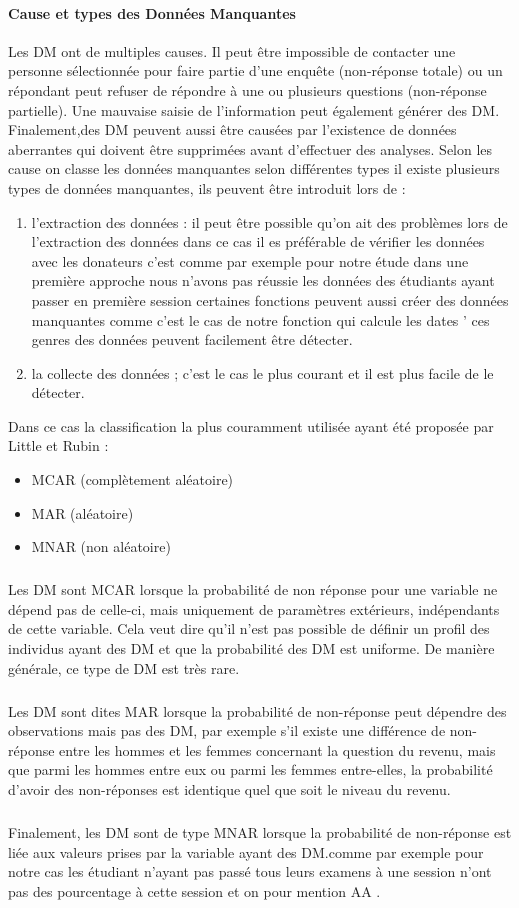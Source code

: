 \paragraph{Cause et types des Données Manquantes} \cite{MissinVal}
Les \ac{DM} ont de multiples causes. Il peut être
impossible de contacter une personne sélectionnée pour faire partie
d'une enquête (non-réponse totale) ou un répondant peut refuser de
répondre à une ou plusieurs questions (non-réponse partielle). Une
mauvaise saisie de l'information peut également générer des \ac{DM}.
Finalement,des \ac{DM} peuvent aussi être causées par l'existence de données
aberrantes qui doivent être supprimées avant d'effectuer des analyses.
Selon les cause on classe les données manquantes selon différentes types
il existe plusieurs types de données manquantes, ils peuvent être introduit lors de :
\begin{enumerate}
\item  l'extraction des données :
il peut être possible qu'on ait des problèmes lors de l'extraction des données 
dans ce cas il es préférable de vérifier les données avec les donateurs c'est comme par exemple pour notre étude dans une première approche nous n'avons pas réussie les données des étudiants ayant passer en première session 
certaines fonctions peuvent aussi créer des données manquantes comme c'est le cas de notre fonction qui calcule les dates '
ces genres des données peuvent facilement être détecter.
\item  la collecte des données ;
c'est le cas le plus courant et il est plus facile de le détecter.
\end{enumerate}

Dans ce cas la classification la plus couramment utilisée ayant été
proposée par Little et Rubin \cite{MissinVal} : 
\begin{itemize}
	\item  \ac{MCAR} (complètement aléatoire)
	\item \ac{MAR} (aléatoire)
	\item \ac{MNAR} (non aléatoire)
\end{itemize}
\subparagraph{}
 Les DM sont MCAR lorsque la probabilité de non réponse pour une variable ne
dépend pas de celle-ci, mais uniquement de paramètres extérieurs,
indépendants de cette variable. Cela veut dire qu'il n'est pas possible
de définir un profil des individus ayant des DM et que la probabilité
des DM est uniforme. De manière générale, ce type de DM est très rare.
\subparagraph{}
Les DM sont dites MAR lorsque la probabilité de non-réponse peut
dépendre des observations mais pas des DM, par exemple s'il existe une
différence de non-réponse entre les hommes et les femmes concernant la
question du revenu, mais que parmi les hommes entre eux ou parmi les
femmes entre-elles, la probabilité d'avoir des non-réponses est
identique quel que soit le niveau du revenu.
\subparagraph{}
Finalement, les DM sont de type MNAR lorsque la probabilité de
non-réponse est liée aux valeurs prises par la variable ayant des
DM.comme par exemple pour notre cas les étudiant n'ayant pas passé tous
leurs examens à une session n'ont pas des pourcentage à cette session et
on pour mention \ac{AA} .

